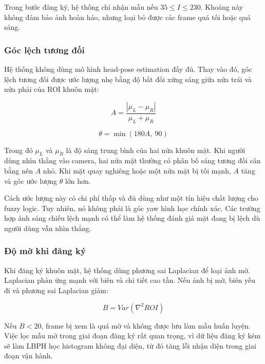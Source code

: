 Trong bước đăng ký, hệ thống chỉ nhận mẫu nếu $35 \le I \le 230$. Khoảng này không đảm bảo ảnh hoàn hảo, nhưng loại bỏ được các frame quá tối hoặc quá sáng.

\subsubsection{Góc lệch tương đối}

Hệ thống không dùng mô hình head-pose estimation đầy đủ. Thay vào đó, góc lệch tương đối được ước lượng nhẹ bằng độ bất đối xứng sáng giữa nửa trái và nửa phải của ROI khuôn mặt:

\begin{equation}
    A = \frac{|\mu_L - \mu_R|}{\mu_L + \mu_R}
\end{equation}

\begin{equation}
    \theta = \min(180A,\ 90)
\end{equation}

Trong đó $\mu_L$ và $\mu_R$ là độ sáng trung bình của hai nửa khuôn mặt. Khi người dùng nhìn thẳng vào camera, hai nửa mặt thường có phân bố sáng tương đối cân bằng nên $A$ nhỏ. Khi mặt quay nghiêng hoặc một nửa mặt bị tối mạnh, $A$ tăng và góc ước lượng $\theta$ lớn hơn.

Cách ước lượng này có chi phí thấp và đủ dùng như một tín hiệu chất lượng cho fuzzy logic. Tuy nhiên, nó không phải là góc yaw hình học chính xác. Các trường hợp ánh sáng chiếu lệch mạnh có thể làm hệ thống đánh giá mặt đang bị lệch dù người dùng vẫn nhìn thẳng.

\subsubsection{Độ mờ khi đăng ký}

Khi đăng ký khuôn mặt, hệ thống dùng phương sai Laplacian để loại ảnh mờ. Laplacian phản ứng mạnh với biên và chi tiết cao tần. Nếu ảnh bị mờ, biên yếu đi và phương sai Laplacian giảm:

\begin{equation}
    B = Var(\nabla^2 ROI)
\end{equation}

Nếu $B < 20$, frame bị xem là quá mờ và không được lưu làm mẫu huấn luyện. Việc lọc mẫu mờ trong giai đoạn đăng ký rất quan trọng, vì dữ liệu đăng ký kém sẽ làm LBPH học histogram không đại diện, từ đó tăng lỗi nhận diện trong giai đoạn vận hành.

